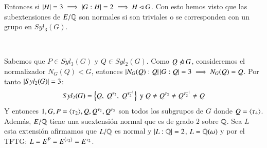 \begin{eg}
\begin{enumerate}
        Entonces si $\left|H\right| = 3 \implies \left|G:H\right| = 2 \implies H \lhd G$. Con esto hemos visto que las subextensiones de $E/\mathbb{Q}$ son normales si son triviales o se corresponden con un grupo en $Syl_3(G)$.
        \begin{center}
            \\
        \end{center}
        Sabemos que $P \in Syl_3(G)$ y $Q \in Syl_2(G)$. Como $Q \centernot \normsub G$, consideremos el normalizador $N_G(Q) < G$, entonces $\left|N_G(Q):Q\right|\left|G:Q\right| = 3 \implies N_G(Q) = Q$. Por tanto $\left|Syl_2(G)\right| = 3$:
        $$
            Syl_2(G) = \left\{Q,\ Q^{\tau_2},\ Q^{\tau_2^{-1}}\right\} \text{ y } Q \neq Q^{\tau_2} \neq Q^{\tau_2^{-1}} \neq Q
        $$
        Y entonces $1, G, P=\langle\tau_2\rangle, Q, Q^{\tau_2}, Q^{\tau_3}$ son todos los subgrupos de $G$ donde $Q = \langle\tau_4\rangle$. Además, $E/\mathbb{Q}$ tiene una suextensión normal que es de grado $2$ sobre $\mathbb{Q}$. Sea $L$ esta extensión afirmamos que $L/\mathbb{Q}$ es normal y $\left|L:\mathbb{Q}\right| = 2$, $L=\mathbb{Q}(\omega)$ y por el TFTG: $L = E^{P} = E^{\langle\tau_2\rangle} = E^{\tau_2}$.


\end{enumerate}
\end{eg}
